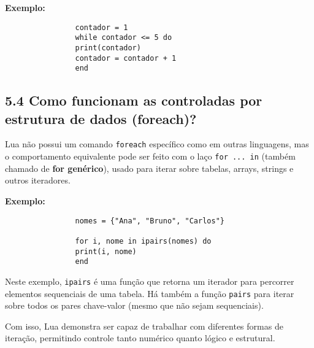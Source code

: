 \documentclass[12pt,a4paper]{article}
\begin{document}
			\textbf{Exemplo:}
			\begin{verbatim}
				contador = 1
				while contador <= 5 do
				print(contador)
				contador = contador + 1
				end
			\end{verbatim}
			
			\subsection*{5.4 Como funcionam as controladas por estrutura de dados (foreach)?}
			
			Lua não possui um comando \verb|foreach| específico como em outras linguagens, mas o comportamento equivalente pode ser feito com o laço \verb|for ... in| (também chamado de \textbf{for genérico}), usado para iterar sobre tabelas, arrays, strings e outros iteradores.
			
			\textbf{Exemplo:}
			\begin{verbatim}
				nomes = {"Ana", "Bruno", "Carlos"}
				
				for i, nome in ipairs(nomes) do
				print(i, nome)
				end
			\end{verbatim}
			
			Neste exemplo, \verb|ipairs| é uma função que retorna um iterador para percorrer elementos sequenciais de uma tabela. Há também a função \verb|pairs| para iterar sobre todos os pares chave-valor (mesmo que não sejam sequenciais).
			
			
			Com isso, Lua demonstra ser capaz de trabalhar com diferentes formas de iteração, permitindo controle tanto numérico quanto lógico e estrutural.
			\newpage
			
			
			
\end{document}
